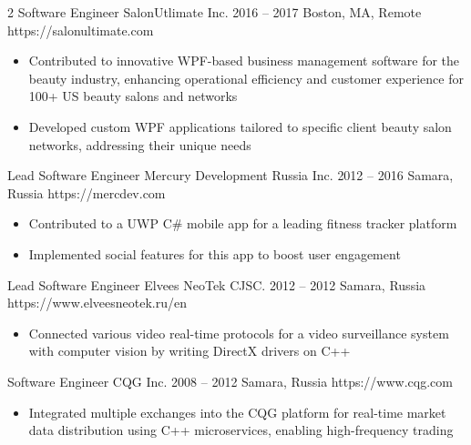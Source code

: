 \documentclass[9pt,a4paper]{igrmkcv}
\begin{document}
\begin{paracol}{2}
    \cvLeftEvent
        {Software Engineer}
        {SalonUtlimate Inc.}
        {2016 -- 2017}
        {Boston, MA, Remote}
        {https://salonultimate.com}

        \begin{itemize}
            \item Contributed to innovative WPF-based business management software for the beauty industry,
                  enhancing operational efficiency and customer experience for 100+ US beauty salons and networks
            \item Developed custom WPF applications tailored to specific client beauty salon networks,
                  addressing their unique needs
        \end{itemize}

    \cvLeftEvent
        {Lead Software Engineer}
        {Mercury Development Russia Inc.}
        {2012 -- 2016}
        {Samara, Russia}
        {https://mercdev.com}

        \begin{itemize}
            \item Contributed to a UWP C\# mobile app for a leading fitness tracker platform
            \item Implemented social features for this app to boost user engagement
        \end{itemize}

    \cvLeftEvent
        {Lead Software Engineer}
        {Elvees NeoTek CJSC.}
        {2012 -- 2012}
        {Samara, Russia}
        {https://www.elveesneotek.ru/en}

        \begin{itemize}
            \item Connected various video real-time protocols for
                  a video surveillance system with computer vision
                  by writing DirectX drivers on C++
        \end{itemize}

    \cvLeftEvent
        {Software Engineer}
        {CQG Inc.}
        {2008 -- 2012}
        {Samara, Russia}
        {https://www.cqg.com}

        \begin{itemize}
            \item Integrated multiple exchanges into the CQG platform for real-time market data distribution
                  using C++ microservices, enabling high-frequency trading
        \end{itemize}


\end{paracol}
\end{document}
